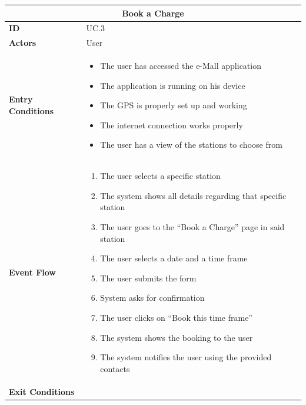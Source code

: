 \documentclass[12pt]{report}
\begin{document}
 \clearpage
    \begin{table}[h]
    \centering
        \begin{adjustbox}{max width=0.89\textwidth}
        \begin{tabular}{ |p{4cm}|p{11cm}|  }
        \hline
        \multicolumn{2}{|c|}{\textbf{Book a Charge}} \\
        \hline
            \textbf{ID} &  UC.3\\
        \hline
            \textbf{Actors} & User\\
        \hline
            \textbf{Entry Conditions} &
                \begin{itemize}
                    \item The user has accessed the e-Mall application
                    \item The application is running on his device
                    \item The GPS is properly set up and working
                    \item The internet connection works properly
                    \item The user has a view of the stations to choose from
                \end{itemize}\\
        \hline
            \textbf{Event Flow} &
                \begin{enumerate}
                    \item The user selects a specific station
                    \item The system shows all details regarding that specific station
                    \item The user goes to the “Book a Charge” page in said station
                    \item The user selects a date and a time frame 
                    \item The user submits the form
                    \item System asks for confirmation
                    \item The user clicks on “Book this time frame”
                    \item The system shows the booking to the user
                    \item The system notifies the user using the provided contacts
                \end{enumerate}\\
        \hline
            \textbf{Exit Conditions} & 

\end{tabular}
\end{adjustbox}
\end{table}
\end{document}
